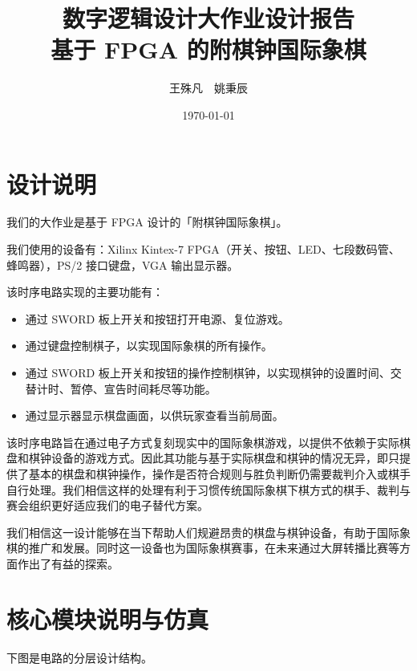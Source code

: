 \documentclass[a4paper, 12pt]{article}
\title{数字逻辑设计大作业设计报告\\基于 FPGA 的附棋钟国际象棋}
\author{王殊凡\ \ 姚秉辰}
\date{\today}
\begin{document}
    \maketitle
    \thispagestyle{empty}

    \newpage
    \tableofcontents

    \newpage

    \section{设计说明}

        我们的大作业是基于 FPGA 设计的「附棋钟国际象棋」。

        我们使用的设备有：Xilinx Kintex-7 FPGA（开关、按钮、LED、七段数码管、蜂鸣器），PS/2 接口键盘，VGA 输出显示器。

        该时序电路实现的主要功能有：

        \begin{itemize}
            \item 通过 SWORD 板上开关和按钮打开电源、复位游戏。

            \item 通过键盘控制棋子，以实现国际象棋的所有操作。

            \item 通过 SWORD 板上开关和按钮的操作控制棋钟，以实现棋钟的设置时间、交替计时、暂停、宣告时间耗尽等功能。
            
            \item 通过显示器显示棋盘画面，以供玩家查看当前局面。
        \end{itemize}

        该时序电路旨在通过电子方式复刻现实中的国际象棋游戏，以提供不依赖于实际棋盘和棋钟设备的游戏方式。因此其功能与基于实际棋盘和棋钟的情况无异，即只提供了基本的棋盘和棋钟操作，操作是否符合规则与胜负判断仍需要裁判介入或棋手自行处理。我们相信这样的处理有利于习惯传统国际象棋下棋方式的棋手、裁判与赛会组织更好适应我们的电子替代方案。

        我们相信这一设计能够在当下帮助人们规避昂贵的棋盘与棋钟设备，有助于国际象棋的推广和发展。同时这一设备也为国际象棋赛事，在未来通过大屏转播比赛等方面作出了有益的探索。

    \section{核心模块说明与仿真}

        下图是电路的分层设计结构。
        
\end{document}
